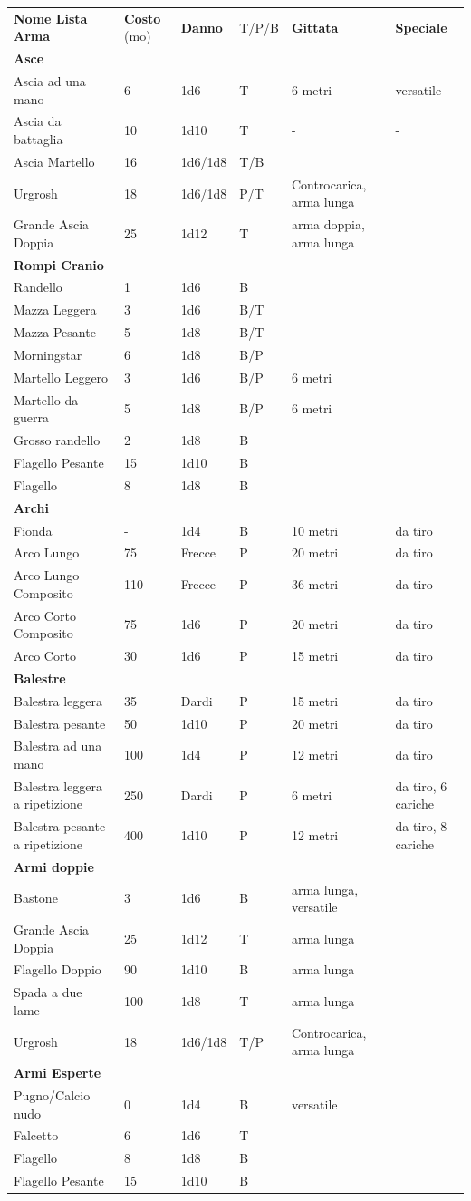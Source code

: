 \documentclass[a4paper,11pt,twoside,openany]{dndbook}
\begin{document}
{\bigskip
\begin{longtable}{|L{3.5cm} |k{1cm} |k{1.5cm}| k{1cm} |L{4.5cm} |k{3cm}|}
	\textbf{Nome Lista Arma} & \textbf{Costo} (mo) & \textbf{Danno} & T/P/B & \textbf{Gittata} & \textbf{Speciale}\tabularnewline
	\textbf{Asce} & & & & & \tabularnewline
	Ascia ad una mano & 6 & 1d6 & T & 6 metri & versatile\tabularnewline
	Ascia da battaglia & 10 & 1d10 & T & - & -\tabularnewline
	Ascia Martello & 16 & 1d6/1d8 & T/B & & \tabularnewline
	Urgrosh & 18 & 1d6/1d8 & P/T & Controcarica, arma lunga & \tabularnewline
	Grande Ascia Doppia & 25 & 1d12 & T & arma doppia, arma lunga & \tabularnewline
	\textbf{Rompi Cranio} & & & & & \tabularnewline
	Randello & 1 & 1d6 & B & & \tabularnewline
	Mazza Leggera & 3 & 1d6 & B/T & & \tabularnewline
	Mazza Pesante & 5 & 1d8 & B/T & & \tabularnewline
	Morningstar & 6 & 1d8 & B/P & & \tabularnewline
	Martello Leggero & 3 & 1d6 & B/P & 6 metri & \tabularnewline
	Martello da guerra & 5 & 1d8 & B/P & 6 metri & \tabularnewline
	Grosso randello & 2 & 1d8 & B & & \tabularnewline
	Flagello Pesante & 15 & 1d10 & B & & \tabularnewline
	Flagello & 8 & 1d8 & B & & \tabularnewline
	\textbf{Archi} & & & & & \tabularnewline
	Fionda & - & 1d4 & B & 10 metri & da tiro\tabularnewline
	Arco Lungo & 75 & Frecce & P & 20 metri & da tiro\tabularnewline
	Arco Lungo Composito & 110 & Frecce & P & 36 metri & da tiro\tabularnewline
	Arco Corto Composito & 75 & 1d6 & P & 20 metri & da tiro\tabularnewline
	Arco Corto & 30 & 1d6 & P & 15 metri & da tiro\tabularnewline
	\textbf{Balestre} & & & & & \tabularnewline
	Balestra leggera & 35 & Dardi & P & 15 metri & da tiro\tabularnewline
	Balestra pesante & 50 & 1d10 & P & 20 metri & da tiro\tabularnewline
	Balestra ad una mano & 100 & 1d4 & P & 12 metri & da tiro\tabularnewline
	Balestra leggera a ripetizione & 250 & Dardi & P & 6 metri & da tiro, 6 cariche\tabularnewline
	Balestra pesante a ripetizione & 400 & 1d10 & P & 12 metri & da tiro, 8 cariche\tabularnewline
	\textbf{Armi doppie} & & & & & \tabularnewline
	Bastone & 3 & 1d6 & B & arma lunga, versatile & \tabularnewline
	Grande Ascia Doppia & 25 & 1d12 & T & arma lunga & \tabularnewline
	Flagello Doppio & 90 & 1d10 & B & arma lunga & \tabularnewline
	Spada a due lame & 100 & 1d8 & T & arma lunga & \tabularnewline
	Urgrosh & 18 & 1d6/1d8 & T/P & Controcarica, arma lunga & \tabularnewline
	\textbf{Armi Esperte} & & & & & \tabularnewline
	Pugno/Calcio nudo & 0 & 1d4 & B & versatile & \tabularnewline
	Falcetto & 6 & 1d6 & T & & \tabularnewline
	Flagello & 8 & 1d8 & B & & \tabularnewline
	Flagello Pesante & 15 & 1d10 & B & & \tabularnewline

\end{longtable}}
\end{document}
